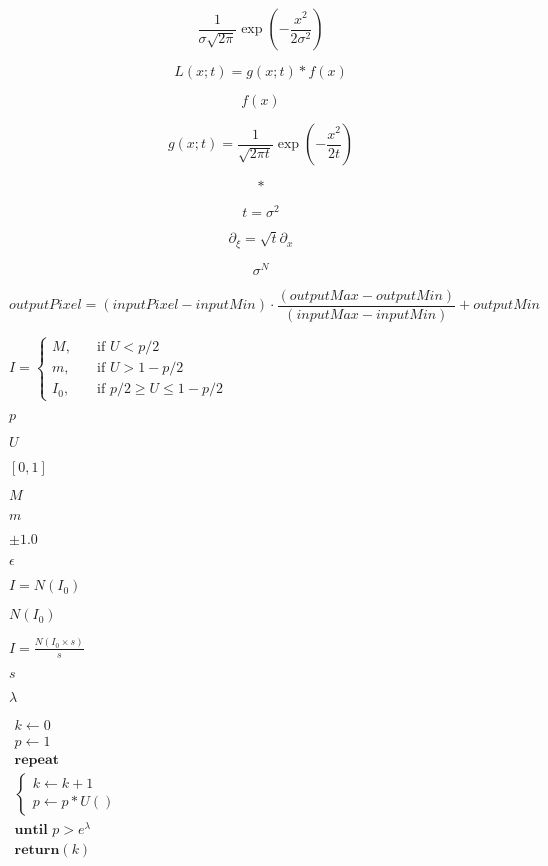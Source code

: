 \documentclass{article}
\begin{document}
\[ \frac{ 1 }{ \sigma \sqrt{ 2 \pi } } \exp{ \left( - \frac{x^2}{ 2 \sigma^2 } \right) } \]
\pagebreak

\[ L(x; t) = g(x; t) \ast f(x) \]
\pagebreak

\[ f(x) \]
\pagebreak

\[ g(x; t) = \frac{1}{ \sqrt{ 2 \pi t} } \exp{ \left( -\frac{x^2}{ 2 t } \right) } \]
\pagebreak

\[\ast\]
\pagebreak

\[ t = \sigma^2 \]
\pagebreak

\[ \partial_\xi = \sqrt{t} \partial_x \]
\pagebreak

\[ \sigma^N \]
\pagebreak

\[ outputPixel = ( inputPixel - inputMin) \cdot \frac{(outputMax - outputMin )}{(inputMax - inputMin)} + outputMin \]
\pagebreak

$ I = \begin{cases} M, & \quad \text{if } U < p/2 \\ m, & \quad \text{if } U > 1 - p/2 \\ I_0, & \quad \text{if } p/2 \geq U \leq 1 - p/2 \end{cases} $
\pagebreak

$ p $
\pagebreak

$ U $
\pagebreak

$ [0,1] $
\pagebreak

$ M $
\pagebreak

$ m $
\pagebreak

$\pm 1.0$
\pagebreak

$ \epsilon $
\pagebreak

$ I = N(I_0) $
\pagebreak

$ N(I_0) $
\pagebreak

$ I = \frac{N(I_0 \times s)}{s} $
\pagebreak

$ s $
\pagebreak

$ \lambda $
\pagebreak

$ \begin{array}{l} k \leftarrow 0 \\ p \leftarrow 1 \\ \textbf{repeat} \\ \left\{ \begin{array}{l} k \leftarrow k+1 \\ p \leftarrow p \ast U() \end{array} \right. \\ \textbf{until } p > e^{\lambda} \\ \textbf{return} (k) \end{array} $
\pagebreak
\end{document}
